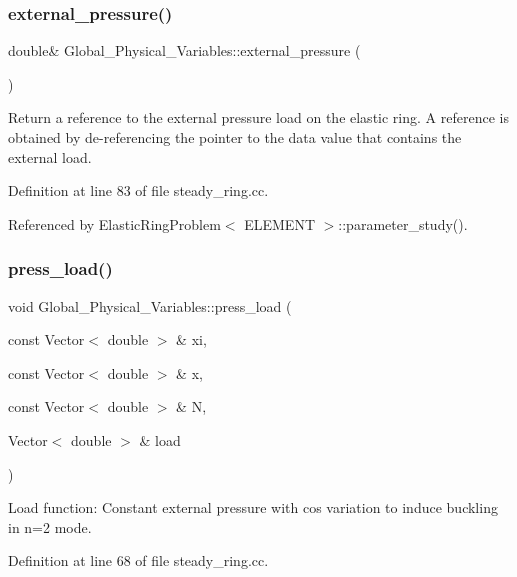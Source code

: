 \subsubsection{\texorpdfstring{external\+\_\+pressure()}{external\_pressure()}}
{\footnotesize\ttfamily double\& Global\+\_\+\+Physical\+\_\+\+Variables\+::external\+\_\+pressure (\begin{DoxyParamCaption}{ }\end{DoxyParamCaption})}



Return a reference to the external pressure load on the elastic ring. A reference is obtained by de-\/referencing the pointer to the data value that contains the external load. 



Definition at line 83 of file steady\+\_\+ring.\+cc.



Referenced by Elastic\+Ring\+Problem$<$ E\+L\+E\+M\+E\+N\+T $>$\+::parameter\+\_\+study().

\mbox{\label{namespaceGlobal__Physical__Variables_a86fd8f502cb8c4c7939ffae742f023eb}} 
\subsubsection{\texorpdfstring{press\+\_\+load()}{press\_load()}}
{\footnotesize\ttfamily void Global\+\_\+\+Physical\+\_\+\+Variables\+::press\+\_\+load (\begin{DoxyParamCaption}\item[{const Vector$<$ double $>$ \&}]{xi,  }\item[{const Vector$<$ double $>$ \&}]{x,  }\item[{const Vector$<$ double $>$ \&}]{N,  }\item[{Vector$<$ double $>$ \&}]{load }\end{DoxyParamCaption})}



Load function\+: Constant external pressure with cos variation to induce buckling in n=2 mode. 



Definition at line 68 of file steady\+\_\+ring.\+cc.



